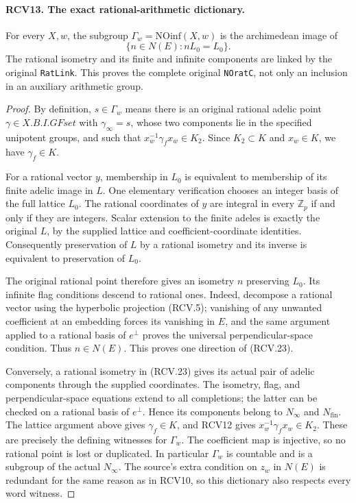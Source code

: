 \paragraph{RCV13. The exact rational-arithmetic dictionary.}
\label{claim:RCV13}
For every \(X,w\), the subgroup \(\Gamma_w=\mathrm{NOinf}(X,w)\)
is the archimedean image of
\[
            \{n\in N(E):nL_0=L_0\}.
\tag{RCV.23}
\]
The rational isometry and its finite and infinite components are
linked by the original \texttt{RatLink}.  This proves the complete
original \texttt{NOratC}, not only an inclusion in an auxiliary
arithmetic group.
\begin{proof}
By definition, \(s\in\Gamma_w\) means there is an original
rational adelic point \(\gamma\in X.B.I.GFset\) with
\(\gamma_\infty=s\), whose two components lie in the specified
unipotent groups, and such that
\(x_w^{-1}\gamma_f x_w\in K_2\).  Since \(K_2\subset K\)
and \(x_w\in K\), we have \(\gamma_f\in K\).

For a rational vector \(y\), membership in \(L_0\) is equivalent
to membership of its finite adelic image in \(L\).  One elementary
verification chooses an integer basis of the full lattice \(L_0\).
The rational coordinates of \(y\) are integral in every \(\mathbb Z_p\)
if and only if they are integers.  Scalar extension to the finite
adeles is exactly the original \(L\), by the supplied lattice
and coefficient-coordinate identities.  Consequently preservation of
\(L\) by a rational isometry and its inverse is equivalent to
preservation of \(L_0\).

The original rational point therefore gives an isometry \(n\)
preserving \(L_0\).  Its infinite flag conditions descend to
rational ones.  Indeed, decompose a rational vector using the
hyperbolic projection (RCV.5); vanishing of any unwanted coefficient
at an embedding forces its vanishing in \(E\), and the same
argument applied to a rational basis of \(e^\perp\) proves
the universal perpendicular-space condition.  Thus \(n\in N(E)\).
This proves one direction of (RCV.23).

Conversely, a rational isometry in (RCV.23) gives its actual pair of
adelic components through the supplied coordinates.  The isometry,
flag, and perpendicular-space equations extend to all completions;
the latter can be checked on a rational basis of \(e^\perp\).
Hence its components belong to \(N_\infty\) and \(N_{\mathrm{fin}}\).
The lattice argument above gives \(\gamma_f\in K\), and RCV12
gives \(x_w^{-1}\gamma_f x_w\in K_2\).  These are precisely
the defining witnesses for \(\Gamma_w\).  The coefficient map
is injective, so no rational point is lost or duplicated.
In particular \(\Gamma_w\) is countable and is a subgroup of
the actual \(N_\infty\).  The source's extra condition on
\(z_w\) in \(N(E)\) is redundant for the same reason as in
RCV10, so this dictionary also respects every word witness.
\end{proof}

